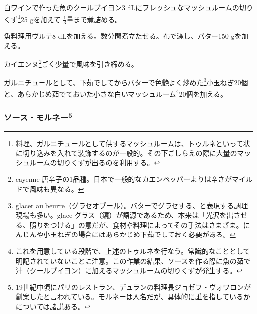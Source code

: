 \begin{recette}


白ワインで作った魚のクールブイヨン3
dLにフレッシュなマッシュルームの切りくず\footnote{料理、ガルニチュールとして供するマッシュルームは、トゥルネといって状に切り込みを入れて装飾するのが一般的。その下ごしらえの際に大量のマッシュルームの切りくずが出るのを利用する。}25
gを加えて \(\frac{1}{3}\)量まで煮詰める。

\protect\hyperlink{veloute-de-poisson}{魚料理用ヴルテ}8
dLを加える。数分間煮立たせる。布で漉し、バター150 gを加える。

カイエンヌ\footnote{cayenne
  唐辛子の1品種。日本で一般的なカエンペッパーよりは辛さがマイルドで風味も異なる。}ごく少量で風味を引き締める。

ガルニチュールとして、下茹でしてからバターで色艶よく炒めた\footnote{glacer
  au
  beurre（グラセオブール）。バターでグラセする、と表現する調理現場も多い。glace
  グラス（鏡）が語源であるため、本来は「光沢を出させる、照りをつける」の意だが、食材や料理によってその手法はさまざま。にんじんや小玉ねぎの場合にはあらかじめ下茹でしておく必要がある。}小玉ねぎ20個と、あらかじめ茹でておいた小さな白いマッシュルーム\footnote{これを用意している段階で、上述のトゥルネを行なう。常識的なこととして明記されていないことに注意。この作業の結果、ソースを作る際に魚の茹で汁（クールブイヨン）に加えるマッシュルームの切りくずが発生する。}20個を加える。

\hypertarget{sauce-mornay}{%
\subsubsection[ソース・モルネー]{\texorpdfstring{ソース・モルネー\footnote{19世紀中頃にパリのレストラン、デュランの料理長ジョゼフ・ヴォワロンが創案したと言われている。モルネーは人名だが、具体的に誰を指しているかについては諸説ある。}}{ソース・モルネー}}\label{sauce-mornay}}




\end{recette}
